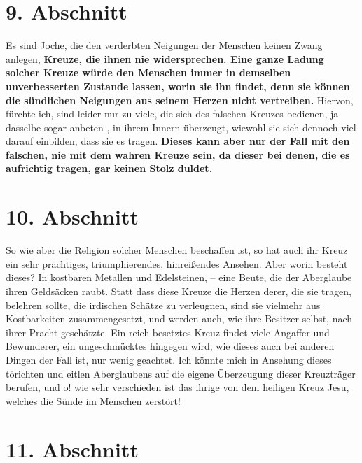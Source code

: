 \section{9. Abschnitt} \label{kap5_ab9}

\label{ref:05_09_kreuz}
Es sind Joche, die den verderbten Neigungen der Menschen keinen Zwang anlegen,
\textbf{Kreuze, die ihnen nie widersprechen. Eine ganze Ladung solcher Kreuze
würde den
Menschen immer in demselben unverbesserten Zustande lassen, worin sie ihn
findet, denn sie können die sündlichen Neigungen aus seinem Herzen nicht
vertreiben.} Hiervon, fürchte ich, sind leider nur zu viele, die sich des
falschen Kreuzes bedienen, ja dasselbe sogar anbeten
, in ihrem Innern überzeugt,
wiewohl sie sich dennoch viel darauf einbilden, dass sie es tragen.
\textbf{Dieses kann
aber nur der Fall mit den falschen, nie mit dem wahren Kreuze sein, da dieser
bei denen, die es aufrichtig tragen, gar keinen Stolz duldet.}

\section{10. Abschnitt} \label{kap5_ab10}

So wie aber die Religion solcher Menschen beschaffen ist, so hat auch ihr Kreuz
ein sehr prächtiges, triumphierendes, hinreißendes Ansehen. Aber worin besteht
dieses? In kostbaren Metallen und Edelsteinen, -- eine Beute, die der Aberglaube
ihren Geldsäcken raubt. Statt dass diese Kreuze die Herzen derer, die sie
tragen,
belehren sollte, die irdischen Schätze zu verleugnen, sind sie vielmehr aus
Kostbarkeiten zusammengesetzt, und werden auch, wie ihre Besitzer selbst, nach
ihrer Pracht geschätzte. Ein reich besetztes Kreuz findet viele Angaffer und
Bewunderer, ein ungeschmücktes hingegen wird, wie dieses auch bei anderen Dingen
der Fall ist, nur wenig geachtet. Ich könnte mich in Ansehung dieses törichten
und eitlen Aberglaubens auf die eigene Überzeugung dieser
Kreuzträger berufen,
und o! wie sehr verschieden ist das ihrige von dem heiligen Kreuz Jesu,
welches die Sünde im Menschen zerstört!

\section{11. Abschnitt} \label{kap5_ab11}


